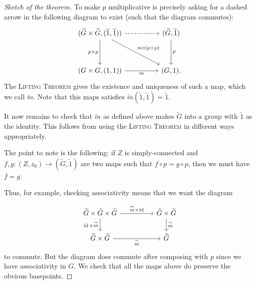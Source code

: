 \documentclass[12pt]{article}
\begin{document}
\begin{proof}[Sketch of the theorem]
	To make $p$ multiplicative is precisely asking for a dashed arrow in the following diagram to exist (such that the diagram commutes):
	\begin{equation*} 
		\begin{tikzcd}
		{(\widetilde{G} \times \widetilde{G}, (\widetilde{1}, \widetilde{1}))} \arrow[dd, "p \times p"'] \arrow[rr, dashed] \arrow[rrdd, "m \circ (p \times p)"] &  & {(\widetilde{G}, \widetilde{1})} \arrow[dd, "p"] \\ \\
		{(G \times G, (1, 1))} \arrow[rr, "m"']  &  & {(G, 1).} 
		\end{tikzcd}
	\end{equation*}
	The \textsc{Lifting Theorem} gives the existence and uniqueness of such a map, which we call $\widetilde{m}$. 
	Note that this maps satisfies $\widetilde{m}(\widetilde{1}, \widetilde{1}) = \widetilde{1}$.

	It now remains to check that $\widetilde{m}$ as defined above makes $\widetilde{G}$ 
	into a group with $\widetilde{1}$ as the identity. 
	This follows from using the \textsc{Lifting Theorem} in different ways appropriately. 

	The point to note is the following: 
	if $Z$ is simply-connected and $f, g \colon (Z, z_{0}) \to (\widetilde{G}, \widetilde{1})$ are two maps such that 
	$f \circ p = g \circ p$, 
	then we must have $f = g$.

	Thus, for example, checking associativity means that we want the diagram

	\begin{equation*} 
		\begin{tikzcd}
		\widetilde{G} \times \widetilde{G} \times \widetilde{G} \arrow[d, "\id \times \widetilde{m}"'] \arrow[rr, "\widetilde{m} \times \id"] &  & \widetilde{G} \times \widetilde{G} \arrow[d, "\widetilde{m}"] \\
		\widetilde{G} \times \widetilde{G} \arrow[rr, "\widetilde{m}"']                                               &  & \widetilde{G}                        
		\end{tikzcd}
	\end{equation*}	
	to commute. But the diagram does commute after composing with $p$ since we have associativity in $G$. 
	We check that all the maps above do preserve the obvious basepoints.
\end{proof}
\end{document}
